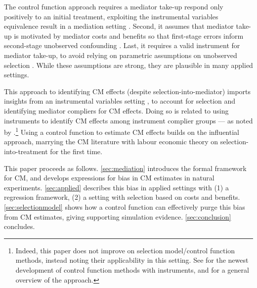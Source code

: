 The control function approach requires a mediator take-up respond only positively to an initial treatment, exploiting the instrumental variables equivalence result in a mediation setting \citep{vytlacil2002independence}.
Second, it assumes that mediator take-up is motivated by mediator costs and benefits so that first-stage errors inform second-stage unobserved confounding \citep{florens2008identification}.
Last, it requires a valid instrument for mediator take-up, to avoid relying on parametric assumptions on unobserved selection \citep{heckman2004using}.
While these assumptions are strong, they are plausible in many applied settings.

This approach to identifying CM effects (despite selection-into-mediator) imports insights from an instrumental variables setting \citep{kline2019heckits}, to account for selection and identifying mediator compliers for CM effects.
Doing so is related to using instruments to identify CM effects among instrument complier groups --- as noted by \cite{frolich2017direct}.\footnote{
    Indeed, this paper does not improve on selection model/control function methods, instead noting their applicability in this setting.
    See \cite{frolich2017direct} for the newest development of control function methods with instruments, and \cite{wooldridge2015control} for a general overview of the approach.
}
Using a control function to estimate CM effects builds on the influential \cite{imai2010identification} approach, marrying the CM literature with labour economic theory on selection-into-treatment for the first time. 

This paper proceeds as follows.
\autoref{sec:mediation} introduces the formal framework for CM, and develops expressions for bias in CM estimates in natural experiments.
\autoref{sec:applied} describes this bias in applied settings with (1) a regression framework, (2) a setting with selection based on costs and benefits.
\autoref{sec:selectionmodel} shows how a control function can effectively purge this bias from CM estimates, giving supporting simulation evidence.
\autoref{sec:conclusion} concludes.
